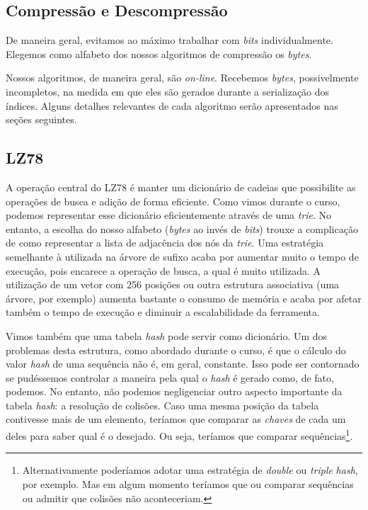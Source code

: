 \documentclass[]{article}
\begin{document}
\subsection{Compressão e Descompressão}

De maneira geral, evitamos ao máximo trabalhar com \textit{bits} individualmente. Elegemos como alfabeto dos nossos algoritmos de compressão os \textit{bytes}.

Nossos algoritmos, de maneira geral, são \textit{on-line}. Recebemos \textit{bytes}, possivelmente incompletos, na medida em que eles são gerados durante a serialização dos índices. Alguns detalhes relevantes de cada algoritmo serão apresentados nas seções seguintes.

\subsection{LZ78}

A operação central do LZ78 é manter um dicionário de cadeias que possibilite as operações de busca e adição de forma eficiente. Como vimos durante o curso, podemos representar esse dicionário eficientemente através de uma \textit{trie}. No entanto, a escolha do nosso alfabeto (\textit{bytes} ao invés de \textit{bits}) trouxe a complicação de como representar a lista de adjacência dos nós da \textit{trie}. Uma estratégia semelhante à utilizada na árvore de sufixo acaba por aumentar muito o tempo de execução, pois encarece a operação de busca, a qual é muito utilizada. A utilização de um vetor com 256 posições ou outra estrutura associativa (uma árvore, por exemplo) aumenta bastante o consumo de memória e acaba por afetar também o tempo de execução e diminuir a escalabilidade da ferramenta.

Vimos também que uma tabela \textit{hash} pode servir como dicionário. Um dos problemas desta estrutura, como abordado durante o curso, é que o cálculo do valor \textit{hash} de uma sequência não é, em geral, constante. Isso pode ser contornado se pudéssemos controlar a maneira pela qual o \textit{hash} é gerado como, de fato, podemos. No entanto, não podemos negligenciar outro aspecto importante da tabela \textit{hash}: a resolução de colisões. Caso uma mesma posição da tabela contivesse mais de um elemento, teríamos que comparar as \textit{chaves} de cada um deles para saber qual é o desejado. Ou seja, teríamos que comparar sequências\footnote{Alternativamente poderíamos adotar uma estratégia de \textit{double} ou \textit{triple} \textit{hash}, por exemplo. Mas em algum momento teríamos que ou comparar sequências ou admitir que colisões não aconteceriam.}.
\end{document}
